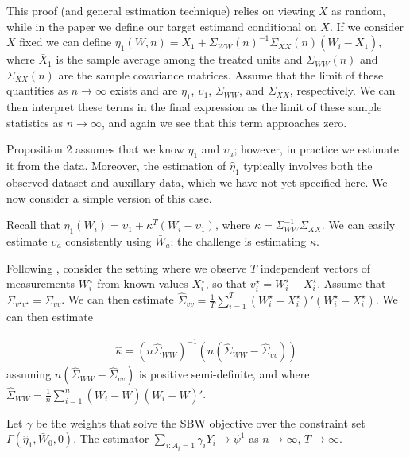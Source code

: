 \begin{remark}
This proof (and general estimation technique) relies on viewing $X$ as random, while in the paper we define our target estimand conditional on $X$. If we consider $X$ fixed we can define $\eta_1(W, n) = \bar{X}_1 + \Sigma_{WW}(n)^{-1}\Sigma_{XX}(n)(W_i - \bar{X}_1)$, where $\bar{X}_1$ is the sample average among the treated units and $\Sigma_{WW}(n)$ and $\Sigma_{XX}(n)$ are the sample covariance matrices. Assume that the limit of these quantities as $n \to \infty$ exists and are $\eta_1$, $\upsilon_1$, $\Sigma_{WW}$, and $\Sigma_{XX}$, respectively. We can then interpret these terms in the final expression as the limit of these sample statistics as $n \to \infty$, and again we see that this term  approaches zero.
\end{remark}

Proposition 2 assumes that we know $\eta_1$ and $\upsilon_a$; however, in practice we estimate it from the data. Moreover, the estimation of $\hat{\eta}_1$ typically involves both the observed dataset and auxillary data, which we have not yet specified here. We now consider a simple version of this case.

Recall that $\eta_1(W_i) = \upsilon_1 + \kappa^T(W_i - \upsilon_1)$, where $\kappa = \Sigma_{WW}^{-1}\Sigma_{XX}$. We can easily estimate $\upsilon_a$ consistently using $\bar{W}_a$; the challenge is estimating $\kappa$. 

Following \cite{gleser1992importance}, consider the setting where we observe $T$ independent vectors of measurements $W_i^\star$ from known values $X_i^\star$, so that $v_i^\star = W_i^\star - X_i^\star$. Assume that $\Sigma_{v^\star v^\star} = \Sigma_{vv}$. We can then estimate $\hat{\Sigma}_{vv} = \frac{1}{T}\sum_{i=1}^T(W_i^\star - X_i^\star)'(W_i^\star - X_i^\star)$. We can then estimate

\begin{align*}
\hat{\kappa} = (n\hat{\Sigma}_{WW})^{-1}(n(\hat{\Sigma}_{WW} - \hat{\Sigma}_{vv}))
\end{align*}
%
assuming $n(\hat{\Sigma}_{WW} - \hat{\Sigma}_{vv})$ is positive semi-definite, and where $\hat{\Sigma}_{WW} = \frac{1}{n}\sum_{i=1}^n (W_i - \bar{W})(W_i - \bar{W})'$. 

\begin{proposition}
Let $\dot{\gamma}$ be the weights that solve the SBW objective over the constraint set $\Gamma(\hat{\eta}_1, \bar{W}_0, 0)$. The estimator $\sum_{i: A_i = 1}\dot{\gamma}_iY_i \to \psi^1$ as $n \to \infty$, $T \to \infty$.
\end{proposition}

